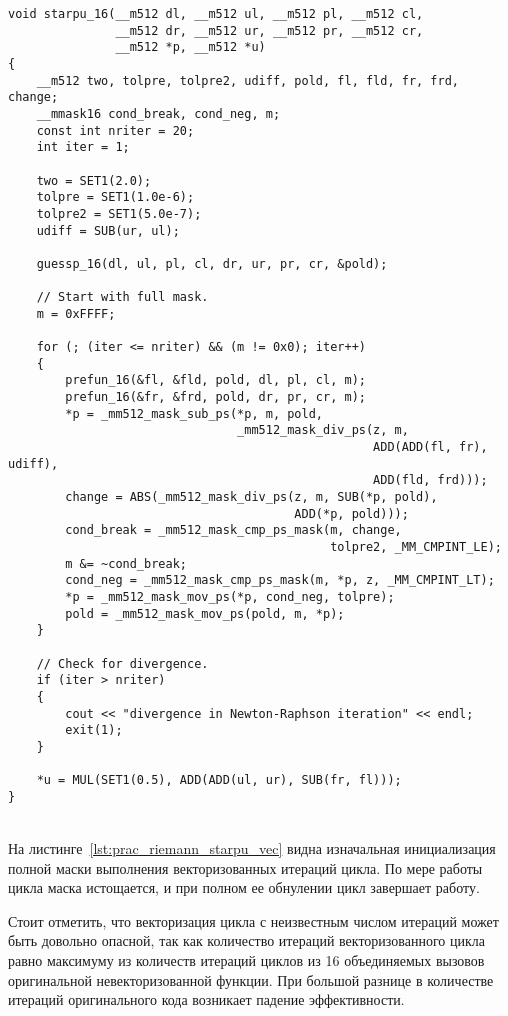 \documentclass[
11pt,%
tightenlines,%
twoside,%
onecolumn,%
nofloats,%
nobibnotes,%
nofootinbib,%
superscriptaddress,%
noshowpacs,%
centertags]%
{revtex4}
\begin{document}
\begin{lstlisting}[caption={Векторизованная версия функции $starpu$.},label={lst:prac_riemann_starpu_vec}]
void starpu_16(__m512 dl, __m512 ul, __m512 pl, __m512 cl,
               __m512 dr, __m512 ur, __m512 pr, __m512 cr,
               __m512 *p, __m512 *u)
{
    __m512 two, tolpre, tolpre2, udiff, pold, fl, fld, fr, frd, change;
    __mmask16 cond_break, cond_neg, m;
    const int nriter = 20;
    int iter = 1;

    two = SET1(2.0);
    tolpre = SET1(1.0e-6);
    tolpre2 = SET1(5.0e-7);
    udiff = SUB(ur, ul);

    guessp_16(dl, ul, pl, cl, dr, ur, pr, cr, &pold);

    // Start with full mask.
    m = 0xFFFF;

    for (; (iter <= nriter) && (m != 0x0); iter++)
    {
        prefun_16(&fl, &fld, pold, dl, pl, cl, m);
        prefun_16(&fr, &frd, pold, dr, pr, cr, m);
        *p = _mm512_mask_sub_ps(*p, m, pold,
                                _mm512_mask_div_ps(z, m,
                                                   ADD(ADD(fl, fr), udiff),
                                                   ADD(fld, frd)));
        change = ABS(_mm512_mask_div_ps(z, m, SUB(*p, pold),
                                        ADD(*p, pold)));
        cond_break = _mm512_mask_cmp_ps_mask(m, change,
                                             tolpre2, _MM_CMPINT_LE);
        m &= ~cond_break;
        cond_neg = _mm512_mask_cmp_ps_mask(m, *p, z, _MM_CMPINT_LT);
        *p = _mm512_mask_mov_ps(*p, cond_neg, tolpre);
        pold = _mm512_mask_mov_ps(pold, m, *p);
    }

    // Check for divergence.
    if (iter > nriter)
    {
        cout << "divergence in Newton-Raphson iteration" << endl;
        exit(1);
    }

    *u = MUL(SET1(0.5), ADD(ADD(ul, ur), SUB(fr, fl)));
}
\end{lstlisting}

\ \\

На листинге~\ref{lst:prac_riemann_starpu_vec} видна изначальная инициализация полной маски выполнения векторизованных итераций цикла. По мере работы цикла маска истощается, и при полном ее обнулении цикл завершает работу.

Стоит отметить, что векторизация цикла с неизвестным числом итераций может быть довольно опасной, так как количество итераций векторизованного цикла равно максимуму из количеств итераций циклов из 16 объединяемых вызовов оригинальной невекторизованной функции.
При большой разнице в количестве итераций оригинального кода возникает падение эффективности.
\end{document}
